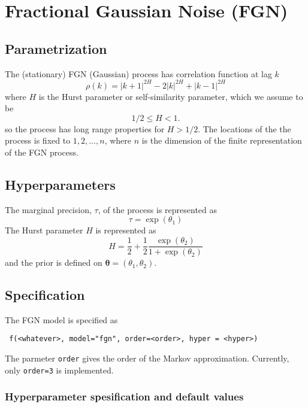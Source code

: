 \documentclass[a4paper,11pt]{article}
\begin{document}
\section*{Fractional Gaussian Noise (FGN)}

\subsection*{Parametrization}

The (stationary) FGN (Gaussian) process has correlation function  at
lag $k$
\begin{displaymath}
    \rho(k) = |k+1|^{2H} -2|k|^{2H} + |k-1|^{2H}
\end{displaymath}
where $H$ is the Hurst parameter or self-similarity parameter, which
we assume to be
\begin{displaymath}
    1/2 \le H < 1.
\end{displaymath}
so the process has long range properties for $H>1/2$. The locations of
the the process is fixed to $1, 2, \ldots, n$, where $n$ is the
dimension of the finite representation of the FGN process.

\subsection*{Hyperparameters}

The marginal precision, $\tau$, of the process is represented as
\begin{displaymath}
    \tau = \exp(\theta_1)
\end{displaymath}
The Hurst parameter $H$ is represented as
\[
    H = \frac{1}{2} + \frac{1}{2} \frac{\exp(\theta_2)}{1+\exp(\theta_2)}
\]
and the prior is defined on $\mathbf{\theta}=(\theta_1,\theta_2)$. 

\subsection*{Specification}

The FGN model is specified as
\begin{verbatim}
 f(<whatever>, model="fgn", order=<order>, hyper = <hyper>)
\end{verbatim}
The parmeter \texttt{order} gives the order of the Markov
approximation. Currently, only \texttt{order=3} is implemented.

\subsubsection*{Hyperparameter spesification and default values}

\end{document}

